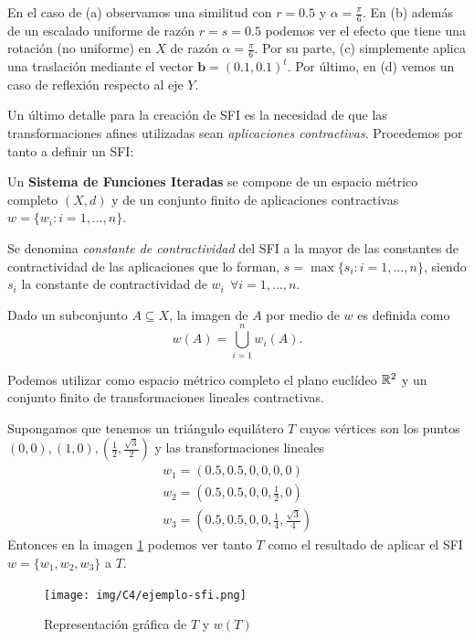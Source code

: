 En el caso de (a) observamos una similitud con $r=0.5$ y $\alpha=\frac{\pi}{6}$. En (b) además de un escalado uniforme de razón $r=s=0.5$ podemos ver el efecto que tiene una rotación (no uniforme) en $X$ de razón $\alpha=\frac{\pi}{6}$. Por su parte, (c) simplemente aplica una traslación mediante el vector $\mathbf b=(0.1,0.1)^t$. Por último, en (d) vemos un caso de reflexión respecto al eje $Y$.

Un último detalle para la creación de SFI es la necesidad de que las transformaciones afines utilizadas sean \textit{aplicaciones contractivas}. Procedemos por tanto a definir un SFI:

\begin{definicion}
    \label{def:SFI}
    Un \textbf{Sistema de Funciones Iteradas} se compone de un espacio métrico completo $(X,d)$ y de un conjunto finito de aplicaciones contractivas $w=\{w_i:i=1,\dots,n\}$.

    Se denomina \textit{constante de contractividad} del SFI a la mayor de las constantes de contractividad de las aplicaciones que lo forman, $s=\max\{s_i:i=1,\dots,n\}$, siendo $s_i$ la constante de contractividad de $w_i \ \ \forall i=1,\dots,n$.

    Dado un subconjunto $A\subseteq X$, la imagen de $A$ por medio de $w$ es definida como
    $$
    w(A)=\bigcup_{i=1}^n w_i(A).
    $$
\end{definicion}

Podemos utilizar como espacio métrico completo el plano euclídeo $\mathbb{R}^2$ y un conjunto finito de transformaciones lineales contractivas.

\begin{ejemplo}
    \label{ejemplo:sfi}
    Supongamos que tenemos un triángulo equilátero $T$ cuyos vértices son los puntos $(0,0),(1,0),(\frac{1}{2},\frac{\sqrt{3}}{2})$ y las transformaciones lineales
    \begin{eqnarray*}
        w_1 = \left(0.5,0.5,0,0,0,0\right) \\
        w_2 = \left(0.5,0.5,0,0,\frac 1 2,0\right) \\
        w_3 = \left(0.5,0.5,0,0,\frac 1 4,\frac{\sqrt{3}}{4}\right)
    \end{eqnarray*}
    Entonces en la imagen \ref{fig:ejemplo-sfi} podemos ver tanto $T$ como el resultado de aplicar el SFI \linebreak $w=\{w_1,w_2,w_3\}$ a $T$.
    \begin{figure} [ht]
    \centering
    \texttt{[image: img/C4/ejemplo-sfi.png]}
    \caption{Representación gráfica de $T$ y $w(T)$}
        \label{fig:ejemplo-sfi}
    \end{figure}
\end{ejemplo}

